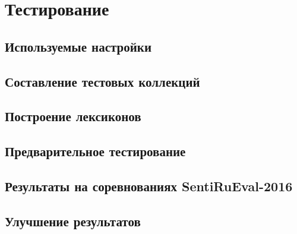 \newpage
\section{Тестирование}
    \subsection{Используемые настройки}
        \subsection{Составление тестовых коллекций}
        \subsection{Построение лексиконов}

    \subsection{Предварительное тестирование}
    \subsection{Результаты на соревнованиях SentiRuEval-2016}
    \subsection{Улучшение результатов}
